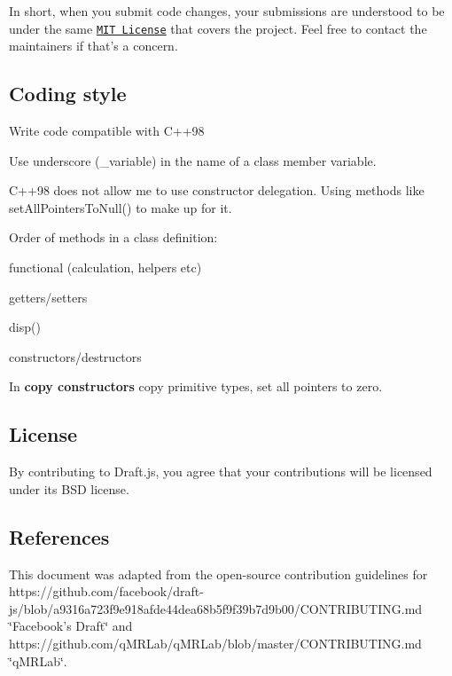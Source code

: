 In short, when you submit code changes, your submissions are understood to be under the same \href{http://choosealicense.com/licenses/mit/}{\tt M\-I\-T License} that covers the project. Feel free to contact the maintainers if that's a concern.

\subsection*{Coding style}


\begin{DoxyItemize}
\item Write code compatible with C++98
\item Use underscore ({\ttfamily \-\_\-variable}) in the name of a class member variable.
\item C++98 does not allow me to use constructor delegation. Using methods like {\ttfamily set\-All\-Pointers\-To\-Null()} to make up for it.
\item Order of methods in a class definition\-:
\begin{DoxyItemize}
\item functional (calculation, helpers etc)
\item getters/setters
\item disp()
\item constructors/destructors
\end{DoxyItemize}
\item In {\bfseries copy constructors} copy primitive types, set all pointers to zero.
\end{DoxyItemize}

\subsection*{License}

By contributing to Draft.\-js, you agree that your contributions will be licensed under its B\-S\-D license.

\subsection*{References}

This document was adapted from the open-\/source contribution guidelines for https\-://github.com/facebook/draft-\/js/blob/a9316a723f9e918afde44dea68b5f9f39b7d9b00/\-C\-O\-N\-T\-R\-I\-B\-U\-T\-I\-N\-G.\-md \char`\"{}\-Facebook's Draft\char`\"{} and https\-://github.com/q\-M\-R\-Lab/q\-M\-R\-Lab/blob/master/\-C\-O\-N\-T\-R\-I\-B\-U\-T\-I\-N\-G.\-md \char`\"{}q\-M\-R\-Lab\char`\"{}. 